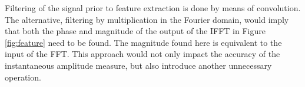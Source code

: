 \documentclass[10pt,twocolumn]{witseiepaper}
\begin{document}
Filtering of the signal prior to feature extraction is done by means of convolution. The alternative, filtering by multiplication in the Fourier domain, would imply that both the phase and magnitude of the output of the IFFT in Figure \ref{fig:feature} need to be found. The magnitude found here is equivalent to the input of the FFT. This approach would not only impact the accuracy of the instantaneous amplitude measure, but also introduce another unnecessary operation.
\end{document}
